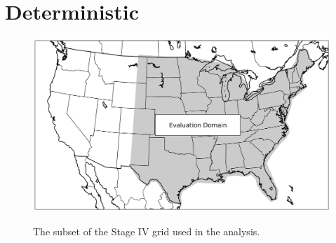 

\chapter{Deterministic}
\label{deterministic}









\clearpage
\begin{figure}[cc]
    \centering
    \includegraphics[width=35pc, angle=0]{./deterministic/figs/domain.png}\\
    \caption{The subset of the Stage IV grid used in the analysis.}
    \label{domain}
\end{figure}


